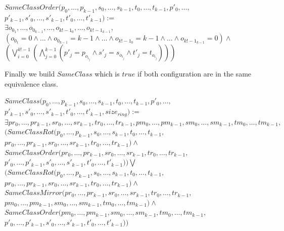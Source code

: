 \documentclass{article}
\begin{document}
\begin{center}
    
    $SameClassOrder (p_{0}, \dots, p_{k-1}, s_{0}, \dots, s_{k-1}, t_{0}, \dots, t_{k-1}, p'_{0}, \dots,$\\
    $p'_{k-1}, s'_{0}, \dots, s'_{k-1}, t'_{0}, \dots, t'_{k-1}):=$\\
    $\exists o_{0_{1}},\dots, o_{0_{k-1}}, \dots, o_{k!-1_{0}}, \dots, o_{k!-1_{k-1}},$\\
    $ ( o_{0_{1}} = 0 \land \dots \land o_{0_{k-1}} = k-1 \land \dots \land o_{k!-1_{0}} = k-1 \land \dots \land o_{k!-1_{k-1}} = 0 ) \land $\\
    $ (\bigvee_{i=0}^{k!-1}  (\bigwedge_{j=0}^{k-1}  (p'_{j} = p_{o_{i_{j}}} \land s'_{j} = s_{o_{i_{j}}} \land t'_{j} = t_{o_{i_{j}}}  ) ) )$
\end{center}

\noindent Finally we build $SameClass$ which is $true$ if both configuration are in the same equivalence class.

\begin{center}
    
    $SameClass (p_{0}, \dots, p_{k-1}, s_{0}, \dots, s_{k-1}, t_{0}, \dots, t_{k-1}, p'_{0}, \dots,$\\
    $p'_{k-1}, s'_{0}, \dots, s'_{k-1}, t'_{0}, \dots, t'_{k-1}, size_{ring}):=$\\
    $\exists pr_{0}, \dots, pr_{k-1}, sr_{0}, \dots, sr_{k-1}, tr_{0}, \dots, tr_{k-1}, pm_{0}, \dots, pm_{k-1}, sm_{0}, \dots, sm_{k-1}, tm_{0}, \dots, tm_{k-1},$\\
    $ (SameClassRot (p_{0}, \dots, p_{k-1}, s_{0}, \dots, s_{k-1}, t_{0}, \dots, t_{k-1},$\\
    $pr_{0}, \dots, pr_{k-1}, sr_{0}, \dots, sr_{k-1}, tr_{0}, \dots, tr_{k-1}) \land$\\
    $SameClassOrder (pr_{0}, \dots, pr_{k-1}, sr_{0}, \dots, sr_{k-1}, tr_{0}, \dots, tr_{k-1},$\\$
    p'_{0}, \dots, p'_{k-1}, s'_{0}, \dots, s'_{k-1}, t'_{0}, \dots, t'_{k-1}))\bigvee$\\
    $ (SameClassRot (p_{0}, \dots, p_{k-1}, s_{0}, \dots, s_{k-1}, t_{0}, \dots, t_{k-1},$\\
    $pr_{0}, \dots, pr_{k-1}, sr_{0}, \dots, sr_{k-1}, tr_{0}, \dots, tr_{k-1}) \land$\\
    $SameClassMirror (pr_{0}, \dots, pr_{k-1}, sr_{0}, \dots, sr_{k-1}, tr_{0}, \dots, tr_{k-1},$\\
    $pm_{0}, \dots, pm_{k-1}, sm_{0}, \dots, sm_{k-1}, tm_{0}, \dots, tm_{k-1})\land$\\
    $SameClassOrder (pm_{0}, \dots, pm_{k-1}, sm_{0}, \dots, sm_{k-1}, tm_{0}, \dots, tm_{k-1},$\\
    $p'_{0}, \dots,p'_{k-1}, s'_{0}, \dots, s'_{k-1}, t'_{0}, \dots, t'_{k-1}) )$
\end{center}
\end{document}
